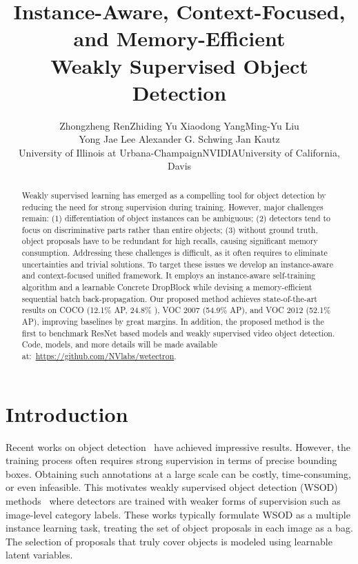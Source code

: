\documentclass[10pt,twocolumn,letterpaper]{article}
\begin{document}
\title{Instance-Aware, Context-Focused, and Memory-Efficient\\
Weakly Supervised Object Detection}

\author{
Zhongzheng Ren\footnotemark[1]
\quad Zhiding Yu
\quad Xiaodong Yang\footnotemark[1]
\quad Ming-Yu Liu\\
\quad Yong Jae Lee
\quad Alexander G.  Schwing
\quad Jan Kautz\\
University of Illinois at Urbana-Champaign\quad NVIDIA\quad University of California, Davis
}

\maketitle


\begin{abstract}
\vspace{-0.1in}
Weakly supervised learning has emerged as a compelling tool for object detection by reducing the need for strong supervision during training. However, major challenges remain: (1) differentiation of object instances can be ambiguous; (2) detectors tend to focus on discriminative parts rather than entire objects; (3) without ground truth, object proposals have to be redundant for high recalls, causing significant memory consumption. Addressing these challenges is difficult, as it often requires to eliminate uncertainties and trivial solutions. To target these issues we develop an instance-aware and context-focused unified framework. It employs an instance-aware self-training algorithm and a learnable Concrete DropBlock while devising a memory-efficient sequential batch back-propagation. Our proposed method achieves state-of-the-art results on COCO (12.1\% AP, 24.8\% ), VOC 2007 (54.9\% AP),  and VOC 2012 (52.1\% AP), improving baselines by great margins. In addition, the proposed method is the first to benchmark ResNet based models and weakly supervised video object detection. 
Code, models, and more details will be made available at:~\url{https://github.com/NVlabs/wetectron}.
\end{abstract}
\vspace{-1em}

\section{Introduction}
\label{sec:intro}
Recent works on object detection~\cite{he2017maskrcnn, ren16faster, yolo, cornernet} have achieved impressive results. However, the training process often requires strong supervision in terms of precise bounding boxes. Obtaining such annotations at a large scale can be costly, time-consuming, or even infeasible. This motivates weakly supervised object detection (WSOD) methods~\cite{Bilen16, tang2017multiple, KantorovOCL16} where detectors are trained with weaker forms of supervision such as image-level category labels. These works typically formulate WSOD as a multiple instance learning task, treating the set of object proposals in each image as a bag. The selection of proposals that truly cover objects is modeled using learnable latent variables. 
\end{document}
